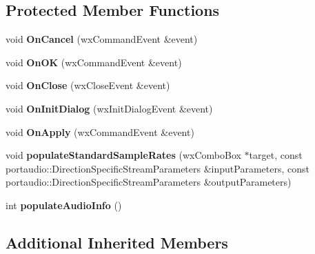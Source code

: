 \subsection*{Protected Member Functions}
\begin{DoxyCompactItemize}
\item 
\hypertarget{class_audio_dlg_ac0710354a8a791b7c8d8987d1bc175a7}{void {\bfseries On\-Cancel} (wx\-Command\-Event \&event)}\label{class_audio_dlg_ac0710354a8a791b7c8d8987d1bc175a7}

\item 
\hypertarget{class_audio_dlg_a5343cdb33868fdf568d05152b642039c}{void {\bfseries On\-O\-K} (wx\-Command\-Event \&event)}\label{class_audio_dlg_a5343cdb33868fdf568d05152b642039c}

\item 
\hypertarget{class_audio_dlg_a9e0ad3464f137b8c9a6de4a558818cf3}{void {\bfseries On\-Close} (wx\-Close\-Event \&event)}\label{class_audio_dlg_a9e0ad3464f137b8c9a6de4a558818cf3}

\item 
\hypertarget{class_audio_dlg_af216bf6872bb49734b3c32b0a9122d8a}{void {\bfseries On\-Init\-Dialog} (wx\-Init\-Dialog\-Event \&event)}\label{class_audio_dlg_af216bf6872bb49734b3c32b0a9122d8a}

\item 
\hypertarget{class_audio_dlg_ab09ae2516d75502062744b924e33fe8b}{void {\bfseries On\-Apply} (wx\-Command\-Event \&event)}\label{class_audio_dlg_ab09ae2516d75502062744b924e33fe8b}

\item 
\hypertarget{class_audio_dlg_a194ed3fb219d7a93824884015e625fe8}{void {\bfseries populate\-Standard\-Sample\-Rates} (wx\-Combo\-Box $\ast$target, const portaudio\-::\-Direction\-Specific\-Stream\-Parameters \&input\-Parameters, const portaudio\-::\-Direction\-Specific\-Stream\-Parameters \&output\-Parameters)}\label{class_audio_dlg_a194ed3fb219d7a93824884015e625fe8}

\item 
\hypertarget{class_audio_dlg_ad1acb1d52175795d265d7adcafc10316}{int {\bfseries populate\-Audio\-Info} ()}\label{class_audio_dlg_ad1acb1d52175795d265d7adcafc10316}

\end{DoxyCompactItemize}
\subsection*{Additional Inherited Members}


